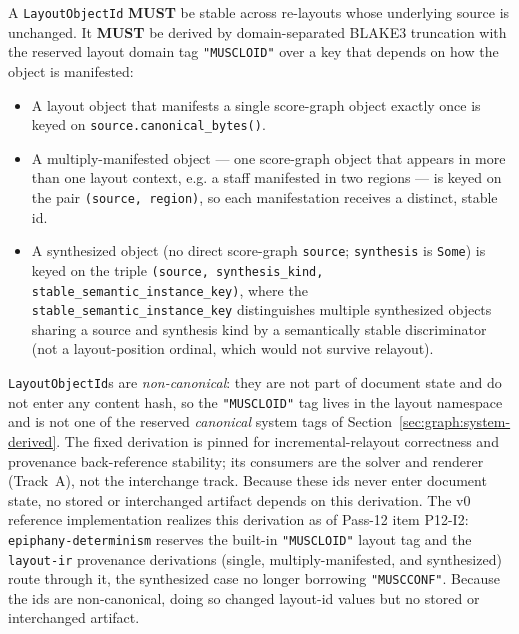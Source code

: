 \documentclass[11pt,letterpaper]{report}
\newcounter{requirement}[chapter]
\newcommand{\MUST}{\textbf{MUST}}
\begin{document}
\begin{requirement}
  \label{req:layoutir:object-id-derivation}
  A \texttt{LayoutObjectId} \MUST{} be stable across re-layouts whose
  underlying source is unchanged. It \MUST{} be derived by
  domain-separated BLAKE3 truncation with the reserved layout domain
  tag \texttt{"MUSCLOID"} over a key that depends on how the object is
  manifested:

  \begin{itemize}
    \item A layout object that manifests a single score-graph object
      exactly once is keyed on \texttt{source.canonical\_bytes()}.
    \item A multiply-manifested object --- one score-graph object that
      appears in more than one layout context, e.g. a staff manifested
      in two regions --- is keyed on the pair
      \texttt{(source,\,region)}, so each manifestation receives a
      distinct, stable id.
    \item A synthesized object (no direct score-graph
      \texttt{source}; \texttt{synthesis} is \texttt{Some}) is keyed
      on the triple \texttt{(source,\,synthesis\_kind,\,
      stable\_semantic\_instance\_key)}, where the
      \texttt{stable\_semantic\_instance\_key} distinguishes multiple
      synthesized objects sharing a source and synthesis kind by a
      semantically stable discriminator (not a layout-position
      ordinal, which would not survive relayout).
  \end{itemize}

  \texttt{LayoutObjectId}s are \emph{non-canonical}: they are not part
  of document state and do not enter any content hash, so the
  \texttt{"MUSCLOID"} tag lives in the layout namespace and is not one
  of the reserved \emph{canonical} system tags of
  Section~\ref{sec:graph:system-derived}. The fixed derivation is
  pinned for incremental-relayout correctness and provenance
  back-reference stability; its consumers are the solver and renderer
  (Track~A), not the interchange track. Because these ids never enter
  document state, no stored or interchanged artifact depends on this
  derivation. The v0 reference implementation realizes this derivation
  as of Pass-12 item P12-I2: \texttt{epiphany-determinism} reserves the
  built-in \texttt{"MUSCLOID"} layout tag and the \texttt{layout-ir}
  provenance derivations (single, multiply-manifested, and synthesized)
  route through it, the synthesized case no longer borrowing
  \texttt{"MUSCCONF"}. Because the ids are non-canonical, doing so
  changed layout-id values but no stored or interchanged artifact.
\end{requirement}
\end{document}
